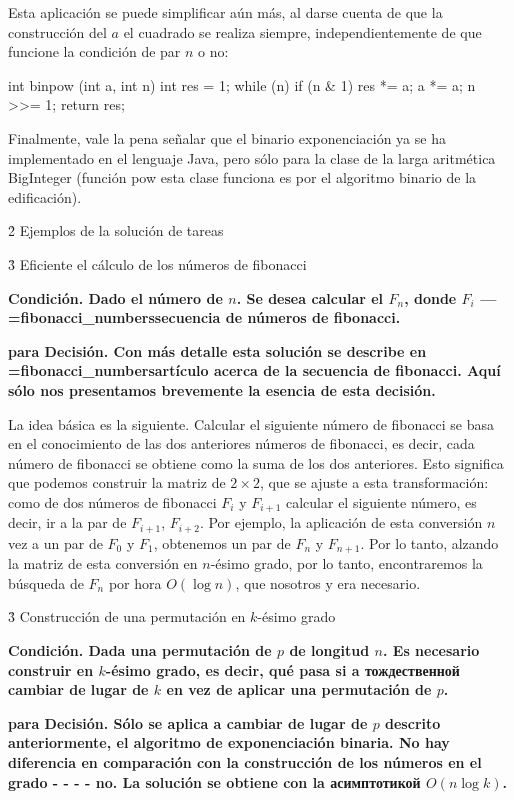 Esta aplicación se puede simplificar aún más, al darse cuenta de que la construcción del $a$ el cuadrado se realiza siempre, independientemente de que funcione la condición de par $n$ o no:

\code
int binpow (int a, int n) {
int res = 1;
while (n) {
if (n & 1)
res *= a;
a *= a;
n >>= 1;
}
return res;
}
\endcode

Finalmente, vale la pena señalar que el binario exponenciación ya se ha implementado en el lenguaje Java, pero sólo para la clase de la larga aritmética BigInteger (función pow esta clase funciona es por el algoritmo binario de la edificación).



\h2{ Ejemplos de la solución de tareas }


\h3{ Eficiente el cálculo de los números de fibonacci }

\bf{Condición}. Dado el número de $n$. Se desea calcular el $F_n$, donde $F_i$ --- \algohref=fibonacci_numbers{secuencia de números de fibonacci}.

\bf{para Decisión}. Con más detalle esta solución se describe en \algohref=fibonacci_numbers{artículo acerca de la secuencia de fibonacci}. Aquí sólo nos presentamos brevemente la esencia de esta decisión.

La idea básica es la siguiente. Calcular el siguiente número de fibonacci se basa en el conocimiento de las dos anteriores números de fibonacci, es decir, cada número de fibonacci se obtiene como la suma de los dos anteriores. Esto significa que podemos construir la matriz de $2 \times 2$, que se ajuste a esta transformación: como de dos números de fibonacci $F_i$ y $F_{i+1}$ calcular el siguiente número, es decir, ir a la par de $F_{i+1}$, $F_{i+2}$. Por ejemplo, la aplicación de esta conversión $n$ vez a un par de $F_0$ y $F_1$, obtenemos un par de $F_n$ y $F_{n+1}$. Por lo tanto, alzando la matriz de esta conversión en $n$-ésimo grado, por lo tanto, encontraremos la búsqueda de $F_n$ por hora $O (\log n)$, que nosotros y era necesario.


\h3{ Construcción de una permutación en $k$-ésimo grado }

\bf{Condición}. Dada una permutación de $p$ de longitud $n$. Es necesario construir en $k$-ésimo grado, es decir, qué pasa si a тождественной cambiar de lugar de $k$ en vez de aplicar una permutación de $p$.

\bf{para Decisión}. Sólo se aplica a cambiar de lugar de $p$ descrito anteriormente, el algoritmo de exponenciación binaria. No hay diferencia en comparación con la construcción de los números en el grado - - - - no. La solución se obtiene con la асимптотикой $O (n \log k)$.

